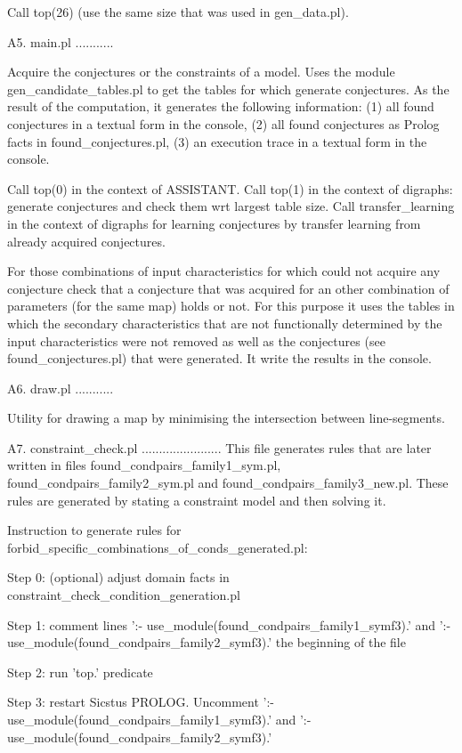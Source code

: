  Call top(26) (use the same size that was used in gen_data.pl).


A5. main.pl
...........

Acquire the conjectures or the constraints of a model.
Uses the module gen_candidate_tables.pl to get the tables for which generate conjectures.
As the result of the computation, it generates the following information:
(1) all found conjectures in a textual form in the console,
(2) all found conjectures as Prolog facts in found_conjectures.pl,
(3) an execution trace in a textual form in the console.

 Call top(0) in the context of ASSISTANT.
 Call top(1) in the context of digraphs: generate conjectures and check them wrt largest table size.
 Call transfer_learning in the context of digraphs for learning conjectures
 by transfer learning from already acquired conjectures.
 
For those combinations of input characteristics for which could not acquire any conjecture
check that a conjecture that was acquired for an other combination of parameters (for the
same map) holds or not. For this purpose it uses the tables in which the secondary characteristics
that are not functionally determined by the input characteristics were not removed as well as
the conjectures (see found_conjectures.pl) that were generated.
It write the results in the console.

A6. draw.pl
...........

 Utility for drawing a map by minimising the intersection between line-segments.

A7. constraint_check.pl
.......................
 This file generates rules that are later written in files found_condpairs_family1_sym.pl,
 found_condpairs_family2_sym.pl and found_condpairs_family3_new.pl. These rules are generated
 by stating a constraint model and then solving it.
 
 Instruction to generate rules for forbid_specific_combinations_of_conds_generated.pl:
 
  Step 0: (optional) adjust domain facts in constraint_check_condition_generation.pl
  
  Step 1: comment lines ':- use_module(found_condpairs_family1_symf3).' and
          ':- use_module(found_condpairs_family2_symf3).' the beginning of the file
          
  Step 2: run 'top.' predicate
  
  Step 3: restart Sicstus PROLOG. Uncomment ':- use_module(found_condpairs_family1_symf3).' and
                                            ':- use_module(found_condpairs_family2_symf3).'
                                            
